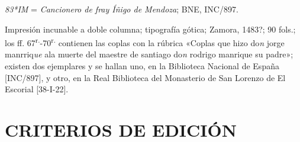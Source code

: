 \documentclass[11pt,a4paper,twoside]{article}
\newcommand{\comillas}[1]{«#1»}
\newcommand{\tsup}[1]{\textsuperscript{#1}}
\begin{document}
\textit{83*IM} = \textit{Cancionero de fray Íñigo de Mendoza}; BNE, INC/897.

Impresión incunable a doble columna; tipografía gótica; Zamora, 1483?; 90 fols.; los ff. 67\tsup{r.}-70\tsup{r.} contienen las coplas con la rúbrica \comillas{Coplas que hizo do\textit{n} jorge manrriq\textit{ue} ala muerte del maestre de santiago do\textit{n} rodrigo manrique su padre}; existen dos ejemplares y se hallan uno, en la Biblioteca Nacional de España [INC/897], y otro, en la Real Biblioteca del Monasterio de San Lorenzo de El Escorial [38-I-22].

\section*{{\fontsize{13}{14.35}\selectfont CRITERIOS DE EDICIÓN}}
\end{document}
